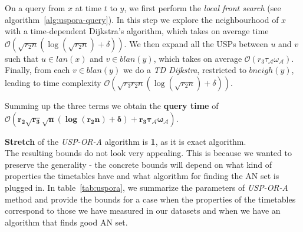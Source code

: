 		\begin{figure}[H]
		\centering
		\end{figure}		
		
		\noindent On a query from $x$ at time $t$ to $y$, we first perform the \textit{local front search} (see algorithm~\ref{alg:uspora-query}). In this step we explore the neighbourhood of $x$ with a time-dependent Dijkstra's algorithm, which takes on average time $\mathcal{O}(\sqrt{r_{2}n} (\log (\sqrt{r_{2}n}) + \delta))$. We then expand all the USPs between $u$ and $v$ such that $u \in lan(x)$ and $v \in blan(y)$, which takes on average $\mathcal{O}(r_{3} \tau_{\mathcal{A}} \omega_{\mathcal{A}})$. Finally, from each $v \in blan(y)$ we do a \textit{TD Dijkstra}, restricted to $bneigh(y)$, leading to time complexity $\mathcal{O}(\sqrt{r_{3} r_{2} n} (\log (\sqrt{r_{2}n}) + \delta))$.
		
		Summing up the three terms we obtain the \textbf{query time} of $\bm{\mathcal{O}(r_{2} \sqrt{r_{3}} \sqrt{n} (\log (r_{2}n) + \delta) + r_{3} \tau_{\mathcal{A}} \omega_{\mathcal{A}})}$.
		
		\textbf{Stretch} of the \textit{USP-OR-A} algorithm is \textbf{1}, as it is exact algorithm. \\
		
		\noindent The resulting bounds do not look very appealing. This is because we wanted to preserve the generality - the concrete bounds will depend on what kind of properties the timetables have and what algorithm for finding the AN set is plugged in. In table~\ref{tab:uspora}, we summarize the parameters of \textit{USP-OR-A} method and provide the bounds for a case when the properties of the timetables correspond to those we have measured in our datasets and when we have an algorithm that finds good AN set.
		
